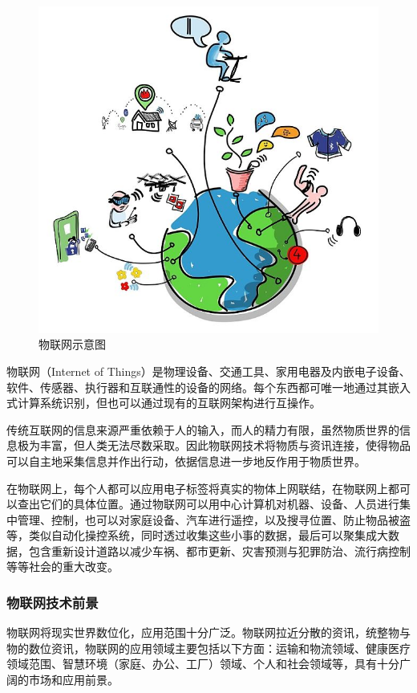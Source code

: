 \documentclass{ctexart}
\begin{document}
\begin{figure}
	\centering
	\includegraphics[scale=0.4]{Internet_of_Things.jpg}
	\caption{物联网示意图}
\end{figure}

物联网（Internet of Things）是物理设备、交通工具、家用电器及内嵌电子设备、软件、传感器、执行器和互联通性的设备的网络。每个东西都可唯一地通过其嵌入式计算系统识别，但也可以通过现有的互联网架构进行互操作。

传统互联网的信息来源严重依赖于人的输入，而人的精力有限，虽然物质世界的信息极为丰富，但人类无法尽数采取。因此物联网技术将物质与资讯连接，使得物品可以自主地采集信息并作出行动，依据信息进一步地反作用于物质世界。

在物联网上，每个人都可以应用电子标签将真实的物体上网联结，在物联网上都可以查出它们的具体位置。通过物联网可以用中心计算机对机器、设备、人员进行集中管理、控制，也可以对家庭设备、汽车进行遥控，以及搜寻位置、防止物品被盗等，类似自动化操控系统，同时透过收集这些小事的数据，最后可以聚集成大数据，包含重新设计道路以减少车祸、都市更新、灾害预测与犯罪防治、流行病控制等等社会的重大改变。

\subsubsection{物联网技术前景}

物联网将现实世界数位化，应用范围十分广泛。物联网拉近分散的资讯，统整物与物的数位资讯，物联网的应用领域主要包括以下方面：运输和物流领域、健康医疗领域范围、智慧环境（家庭、办公、工厂）领域、个人和社会领域等，具有十分广阔的市场和应用前景。
\end{document}
